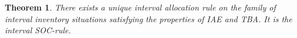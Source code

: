 \documentclass[12pt]{article}
\newtheorem{thm}{\sc Theorem}[section]
\begin{document}

\begin{thm}
\label{th.1.}  There exists a unique interval allocation rule on the family of interval inventory situations satisfying the properties of IAE and TBA. It is the interval SOC-rule.
\end{thm}
\end{document}
